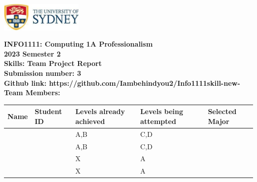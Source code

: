 \documentclass[a4paper, 11pt]{report}
\begin{document}
\begin{titlepage}
\begin{flushright}
\includegraphics[width=4cm]{USyd}\\[2cm]
\end{flushright}
\center 
\textbf{\huge INFO1111: Computing 1A Professionalism}\\[0.75cm]
\textbf{\huge 2023 Semester 2}\\[2cm]
\textbf{\huge Skills: Team Project Report}\\[3cm]

\textbf{\huge Submission number: 3}\\[0.75cm]
\textbf{Github link: https://github.com/Iambehindyou2/Info1111skill-new-}\\[0.75cm]
\textbf{\huge Team Members:}\\[0.75cm]

\begin{tabular}{|p{}|p{}|p{}|p{}|p{}|}
	\hline
	Name & Student ID & \raggedright{Levels already achieved} & \raggedright{Levels being attempted} & Selected Major \\
	\hline
	\hline
	\raggedright{\studA} & \sidA & A,B & C,D& \majA \\
	\raggedright{\studB} & \sidB & A,B & C,D& \majB \\
	\raggedright{\studC} & \sidC & X & A & \majC \\
	\raggedright{\studD} & \sidD & X & A & \majD \\
	\hline
\end{tabular}
\thispagestyle{empty}
\end{titlepage}


\newpage
\end{document}
